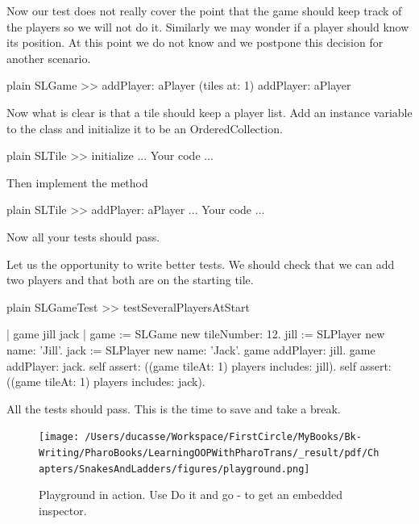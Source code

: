 \documentclass[10pt,twoside,english]{_support/latex/sbabook/sbabook}
\begin{document}
Now our test does not really cover the point that the game should keep track of the players
so we will not do it. Similarly we may wonder if a player should know its position. At this point we do not know and we postpone this decision for another scenario.

\begin{displaycode}{plain}
SLGame >> addPlayer: aPlayer	
	(tiles at: 1) addPlayer: aPlayer
\end{displaycode}

Now what is clear is that a tile should keep a player list. Add an instance variable  to the  class and initialize it to be an OrderedCollection. 

\begin{displaycode}{plain}
SLTile >> initialize
	...  Your code ...
\end{displaycode}

Then implement the method 

\begin{displaycode}{plain}
SLTile >> addPlayer: aPlayer
	... Your code ...
\end{displaycode}

Now all your tests should pass.

Let us the opportunity to write better tests. We should check that we can add two players and that both are on the starting tile. 

\begin{displaycode}{plain}
SLGameTest >> testSeveralPlayersAtStart

	| game jill jack |
	game := SLGame new tileNumber: 12.
	jill := SLPlayer new name: 'Jill'.
	jack := SLPlayer new name: 'Jack'.
	game addPlayer: jill.
	game addPlayer: jack.
	self assert: ((game tileAt: 1) players includes: jill).
	self assert: ((game tileAt: 1) players includes: jack).
\end{displaycode}

All the tests should pass. This is the time to save and take a break.


\begin{figure}

\begin{center}
\texttt{[image: /Users/ducasse/Workspace/FirstCircle/MyBooks/Bk-Writing/PharoBooks/LearningOOPWithPharoTrans/\_result/pdf/Chapters/SnakesAndLadders/figures/playground.png]}\caption{Playground in action. Use Do it and go - to get an embedded inspector.\label{fig:snakesplay}}\end{center}
\end{figure}
\end{document}
